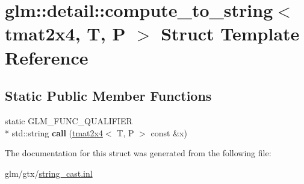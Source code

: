 \hypertarget{structglm_1_1detail_1_1compute__to__string_3_01tmat2x4_00_01T_00_01P_01_4}{\section{glm\-:\-:detail\-:\-:compute\-\_\-to\-\_\-string$<$ tmat2x4, T, P $>$ Struct Template Reference}
\label{structglm_1_1detail_1_1compute__to__string_3_01tmat2x4_00_01T_00_01P_01_4}
}
\subsection*{Static Public Member Functions}
\begin{DoxyCompactItemize}
\item 
\hypertarget{structglm_1_1detail_1_1compute__to__string_3_01tmat2x4_00_01T_00_01P_01_4_a4db0bd22adda3c7b7cb7e697aefe0a76}{static G\-L\-M\-\_\-\-F\-U\-N\-C\-\_\-\-Q\-U\-A\-L\-I\-F\-I\-E\-R \\*
std\-::string {\bfseries call} (\hyperlink{structglm_1_1tmat2x4}{tmat2x4}$<$ T, P $>$ const \&x)}\label{structglm_1_1detail_1_1compute__to__string_3_01tmat2x4_00_01T_00_01P_01_4_a4db0bd22adda3c7b7cb7e697aefe0a76}

\end{DoxyCompactItemize}


The documentation for this struct was generated from the following file\-:\begin{DoxyCompactItemize}
\item 
glm/gtx/\hyperlink{string__cast_8inl}{string\-\_\-cast.\-inl}\end{DoxyCompactItemize}
